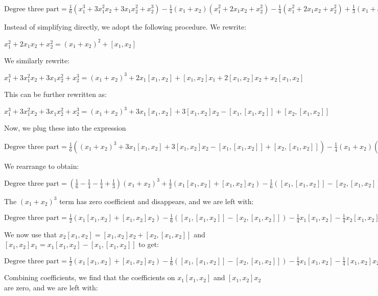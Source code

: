 $\mbox{Degree three part} = \frac{1}{6}(x_1^3 + 3x_1^2x_2 + 3x_1x_2^2 + x_2^3) - \frac{1}{4}(x_1 + x_2)(x_1^2 + 2x_1x_2 + x_2^2) - \frac{1}{4}(x_1^2 + 2x_1x_2 + x_2^2) + \frac{1}{3}(x_1 + x_2)^3$

Instead of simplifying directly, we adopt the following procedure. We rewrite:

$x_1^2 + 2x_1x_2 + x_2^2 = (x_1 + x_2)^2 + [x_1,x_2]$

We similarly rewrite:

$x_1^3 + 3x_1^2x_2 + 3x_1x_2^2 + x_2^3 = (x_1 + x_2)^3 + 2x_1[x_1,x_2] + [x_1,x_2]x_1 + 2[x_1,x_2]x_2 + x_2[x_1,x_2]$

This can be further rewritten as:

$x_1^3 + 3x_1^2x_2 + 3x_1x_2^2 + x_2^3 = (x_1 + x_2)^3 + 3x_1[x_1,x_2] + 3[x_1,x_2]x_2 - [x_1,[x_1,x_2]] + [x_2,[x_1,x_2]]$

Now, we plug these into the expression 

$\mbox{Degree three part} = \frac{1}{6}((x_1 + x_2)^3 + 3x_1[x_1,x_2] + 3[x_1,x_2]x_2 - [x_1,[x_1,x_2]] + [x_2,[x_1,x_2]]) - \frac{1}{4}(x_1 + x_2)((x_1 + x_2)^2 + [x_1,x_2]) - \frac{1}{4}((x_1 + x_2)^2 + [x_1,x_2])(x_1 + x_2) + \frac{1}{3}(x_1 + x_2)^3$

We rearrange to obtain:

$\mbox{Degree three part} = \left(\frac{1}{6} - \frac{1}{4} - \frac{1}{4} + \frac{1}{3}\right)(x_1 + x_2)^3 + \frac{1}{2}(x_1[x_1,x_2] + [x_1,x_2]x_2) - \frac{1}{6}([x_1,[x_1,x_2]] - [x_2,[x_1,x_2]]) - \frac{1}{4}(x_1 + x_2)[x_1,x_2] - \frac{1}{4}([x_1,x_2](x_1 + x_2))$

The $(x_1 + x_2)^3$ term has zero coefficient and disappears, and we are left with:

$\mbox{Degree three part} = \frac{1}{2}(x_1[x_1,x_2] + [x_1,x_2]x_2) - \frac{1}{6}([x_1,[x_1,x_2]] - [x_2,[x_1,x_2]]) - \frac{1}{4}x_1[x_1,x_2] - \frac{1}{4}x_2[x_1,x_2] - \frac{1}{4}[x_1,x_2]x_1 - \frac{1}{4}[x_1,x_2]x_2$

We now use that $x_2[x_1,x_2] = [x_1,x_2]x_2 + [x_2,[x_1,x_2]]$ and $[x_1,x_2]x_1 = x_1[x_1,x_2] - [x_1,[x_1,x_2]]$ to get:

$\mbox{Degree three part} = \frac{1}{2}(x_1[x_1,x_2] + [x_1,x_2]x_2) - \frac{1}{6}([x_1,[x_1,x_2]] - [x_2,[x_1,x_2]]) - \frac{1}{4}x_1[x_1,x_2] - \frac{1}{4}[x_1,x_2]x_2 - \frac{1}{4}[x_2,[x_1,x_2]] - \frac{1}{4}x_1[x_1,x_2] + \frac{1}{4}[x_1,[x_1,x_2]] - \frac{1}{4}[x_1,x_2]x_2$

Combining coefficients, we find that the coefficients on $x_1[x_1,x_2]$ and $[x_1,x_2]x_2$ are zero, and we are left with:

